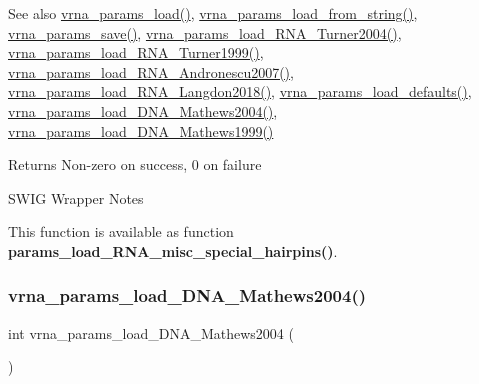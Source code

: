 \begin{DoxySeeAlso}{See also}
\mbox{\hyperlink{group__energy__parameters__rw_gabb0583595c67094986ef90cb4f1c7555}{vrna\+\_\+params\+\_\+load()}}, \mbox{\hyperlink{group__energy__parameters__rw_gabcd9cc7040a6b633b56b1cbd6a14d68e}{vrna\+\_\+params\+\_\+load\+\_\+from\+\_\+string()}}, \mbox{\hyperlink{group__energy__parameters__rw_ga0de3731b3e4017c52bd678549f6c4ae5}{vrna\+\_\+params\+\_\+save()}}, \mbox{\hyperlink{group__energy__parameters__rw_ga7327fe66ef60c33ba80a87c04db0ee83}{vrna\+\_\+params\+\_\+load\+\_\+\+R\+N\+A\+\_\+\+Turner2004()}}, \mbox{\hyperlink{group__energy__parameters__rw_ga804393b6dfe06a2c6cae89219dffabb1}{vrna\+\_\+params\+\_\+load\+\_\+\+R\+N\+A\+\_\+\+Turner1999()}}, \mbox{\hyperlink{group__energy__parameters__rw_ga511a1c17c0fd10a1fbb0936674712ff8}{vrna\+\_\+params\+\_\+load\+\_\+\+R\+N\+A\+\_\+\+Andronescu2007()}}, \mbox{\hyperlink{group__energy__parameters__rw_ga3a87fe5e73eb906c0fa26f2c42c787fd}{vrna\+\_\+params\+\_\+load\+\_\+\+R\+N\+A\+\_\+\+Langdon2018()}}, \mbox{\hyperlink{group__energy__parameters__rw_ga413bc688695c9a707dbcc678412d6792}{vrna\+\_\+params\+\_\+load\+\_\+defaults()}}, \mbox{\hyperlink{group__energy__parameters__rw_gafa45b5734355baa634ca0a2e2857563e}{vrna\+\_\+params\+\_\+load\+\_\+\+D\+N\+A\+\_\+\+Mathews2004()}}, \mbox{\hyperlink{group__energy__parameters__rw_ga4d897130a700f86b7d4035a95f25615a}{vrna\+\_\+params\+\_\+load\+\_\+\+D\+N\+A\+\_\+\+Mathews1999()}}
\end{DoxySeeAlso}
\begin{DoxyReturn}{Returns}
Non-\/zero on success, 0 on failure
\end{DoxyReturn}
\begin{DoxyRefDesc}{S\+W\+I\+G Wrapper Notes}
\item[\mbox{\hyperlink{wrappers__wrappers000106}{S\+W\+I\+G Wrapper Notes}}]This function is available as function {\bfseries{params\+\_\+load\+\_\+\+R\+N\+A\+\_\+misc\+\_\+special\+\_\+hairpins()}}. \end{DoxyRefDesc}
\mbox{\label{group__energy__parameters__rw_gafa45b5734355baa634ca0a2e2857563e}} 
\subsubsection{\texorpdfstring{vrna\_params\_load\_DNA\_Mathews2004()}{vrna\_params\_load\_DNA\_Mathews2004()}}
{\footnotesize\ttfamily int vrna\+\_\+params\+\_\+load\+\_\+\+D\+N\+A\+\_\+\+Mathews2004 (\begin{DoxyParamCaption}\item[{void}]{ }\end{DoxyParamCaption})}



